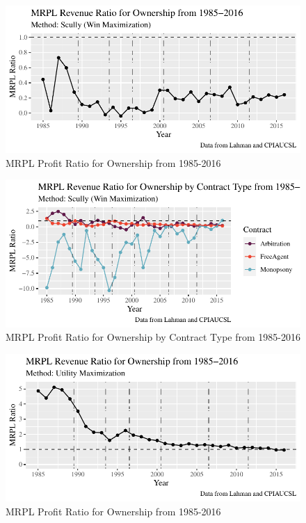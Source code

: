 \documentclass[
  12pt,
  letterpaper,
  DIV=11,
  numbers=noendperiod]{scrartcl}
\begin{document}
\begin{figure}

{\centering \includegraphics{FullDraft3_files/figure-pdf/fig-LeagueWPCT-1.pdf}

}

\caption{\label{fig-LeagueWPCT}MRPL Profit Ratio for Ownership from
1985-2016}

\end{figure}

\begin{figure}

{\centering \includegraphics{FullDraft3_files/figure-pdf/fig-ContractWPCT-1.pdf}

}

\caption{\label{fig-ContractWPCT}MRPL Profit Ratio for Ownership by
Contract Type from 1985-2016}

\end{figure}

\begin{figure}

{\centering \includegraphics{FullDraft3_files/figure-pdf/fig-LeagueRSRC-1.pdf}

}

\caption{\label{fig-LeagueRSRC}MRPL Profit Ratio for Ownership from
1985-2016}

\end{figure}
\end{document}
